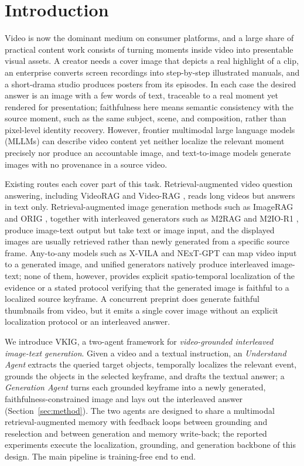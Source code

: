 \section{Introduction}\label{sec:intro}

Video is now the dominant medium on consumer platforms, and a large share of
practical content work consists of turning moments inside video into
presentable visual assets.
A creator needs a cover image that depicts a real highlight of a clip, an
enterprise converts screen recordings into step-by-step illustrated manuals,
and a short-drama studio produces posters from its episodes.
In each case the desired answer is an image with a few words of text,
traceable to a real moment yet rendered for presentation; faithfulness here
means semantic consistency with the source moment, such as the same subject,
scene, and composition, rather than pixel-level identity recovery.
However, frontier multimodal large language models (MLLMs) can describe video
content yet neither localize the relevant moment precisely nor produce an
accountable image, and text-to-image models generate images with no
provenance in a source video.

Existing routes each cover part of this task.
Retrieval-augmented video question answering, including VideoRAG
\citep{videorag2502} and Video-RAG \citep{videorag2411}, reads long videos
but answers in text only.
Retrieval-augmented image generation methods such as ImageRAG
\citep{imagerag2502} and ORIG \citep{orig2510}, together with interleaved
generators such as M2RAG \citep{m2rag2411} and M2IO-R1 \citep{m2ior12508},
produce image-text output but take text or image input, and the displayed
images are usually retrieved rather than newly generated from a specific
source frame.
Any-to-any models such as X-VILA \citep{xvila2405} and NExT-GPT
\citep{nextgpt2309} can map video input to a generated image, and unified
generators \citep{emu352510,showo22506} natively produce interleaved
image-text; none of them, however, provides explicit spatio-temporal
localization of the evidence or a stated protocol verifying that the
generated image is faithful to a localized source keyframe.
A concurrent preprint \citep{pvtg2607} does generate faithful thumbnails from
video, but it emits a single cover image without an explicit localization
protocol or an interleaved answer.

We introduce VKIG, a two-agent framework for \emph{video-grounded interleaved
image-text generation}.
Given a video and a textual instruction, an \emph{Understand Agent} extracts
the queried target objects, temporally localizes the relevant event, grounds
the objects in the selected keyframe, and drafts the textual answer; a
\emph{Generation Agent} turns each grounded keyframe into a newly generated,
faithfulness-constrained image and lays out the interleaved answer
(Section~\ref{sec:method}).
The two agents are designed to share a multimodal retrieval-augmented memory
with feedback loops between grounding and reselection and between generation
and memory write-back; the reported experiments execute the localization,
grounding, and generation backbone of this design.
The main pipeline is training-free end to end.

